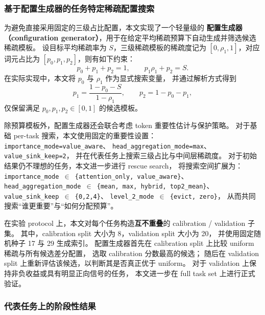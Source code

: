 
\subsubsection{基于配置生成器的任务特定稀疏配置搜索}

为避免直接采用固定的三级占比配置，本文实现了一个轻量级的
\textbf{配置生成器（configuration generator）}，用于在给定平均稀疏预算下自动生成并筛选候选稀疏模板。
设目标平均稀疏率为 $S$，三级稀疏模板的稀疏度记为
\(
[0,\rho_1,1]
\)，对应词元占比为
\(
[p_0,p_1,p_2]
\)，则有如下约束：
\begin{equation}
p_0 + p_1 + p_2 = 1,
\qquad
p_1 \rho_1 + p_2 = S .
\end{equation}
在实际实现中，本文将 $p_0$ 与 $\rho_1$ 作为显式搜索变量，
并通过解析方式得到
\begin{equation}
p_1 = \frac{1-p_0-S}{1-\rho_1},
\qquad
p_2 = 1-p_0-p_1 ,
\end{equation}
仅保留满足 $p_0,p_1,p_2 \in [0,1]$ 的候选模板。

除预算模板外，配置生成器还会联合考虑 token 重要性估计与保护策略。
对于基础 per-task 搜索，本文使用固定的重要性设置：
\texttt{importance\_mode=value\_aware}、
\texttt{head\_aggregation\_mode=max}、
\texttt{value\_sink\_keep=2}，
并在代表任务上搜索三级占比与中间层稀疏度。
对于初始结果仍不理想的任务，本文进一步进行 rescue search，
将搜索空间扩展为：
\texttt{importance\_mode \(\in\) \{attention\_only, value\_aware\}}、
\texttt{head\_aggregation\_mode \(\in\) \{mean, max, hybrid, top2\_mean\}}、
\texttt{value\_sink\_keep \(\in\) \{0,2,4\}}、
\texttt{level\_2\_mode \(\in\) \{evict, zero\}}，
从而共同搜索“谁更重要”与“如何分配预算”。

在实验 protocol 上，本文对每个任务构造\textbf{互不重叠}的 calibration / validation 子集。
其中，calibration split 大小为 8，validation split 大小为 20，
并使用固定随机种子 17 与 29 生成索引。
配置生成器首先在 calibration split 上比较 uniform 稀疏与所有候选差分配置，
选取 calibration 分数最高的候选；
随后在 validation split 上重新评估该候选，以判断其是否真正优于 uniform。
对于 validation 上保持非负收益或具有明显正向信号的任务，
本文进一步在 full task set 上进行正式验证。

\subsubsection{代表任务上的阶段性结果}

